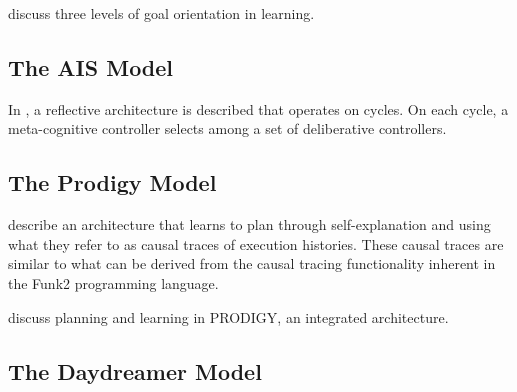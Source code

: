 \cite{ngbereiter1995tlgol} discuss three levels of goal orientation in learning.

\subsection{The AIS Model}

In \cite{hayesroth1995aai}, a reflective architecture is described that operates on cycles.
On each cycle, a meta-cognitive controller selects among a set of deliberative controllers.

\subsection{The Prodigy Model}

\cite{carbonell1991pia} describe an architecture that learns to plan through self-explanation and using what they refer to as causal traces of execution histories.
These causal traces are similar to what can be derived from the causal tracing functionality inherent in the Funk2 programming language.

\cite{carbonell1995palp} discuss planning and learning in PRODIGY, an integrated architecture.

\subsection{The Daydreamer Model}


\cite{mueller1990dha}
























































